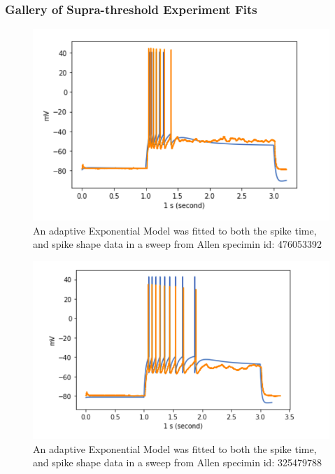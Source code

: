 \subsubsection{Gallery of Supra-threshold Experiment Fits}
\begin{figure}
    \centering
    \includegraphics[scale=0.75]{figures/adexp_fit_allen_spec_id_476053392.png}
    \caption{An adaptive Exponential Model was fitted to both the spike time, and spike shape data in a sweep from Allen specimin id: 476053392}        \label{fig:mutispiking fit specimen 476053392}

\end{figure}



\begin{figure}
    \centering
    \includegraphics[scale=0.75]{figures/adexp_fit_allen_specid_325479788.png}
    \caption{ An adaptive Exponential Model was fitted to both the spike time, and spike shape data in a sweep from Allen specimin id: 325479788}
    \label{fig:mutispiking fit specimen 325479788}
\end{figure}


